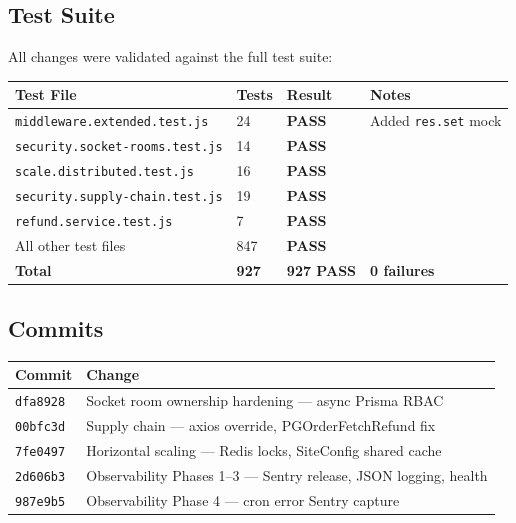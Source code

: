 \documentclass[12pt,a4paper]{article}
\newcommand{\cellok}[1]{\cellcolor{ok!15}\textbf{\color{ok}#1}}
\begin{document}
\subsection{Test Suite}

All changes were validated against the full test suite:

\begin{center}
\begin{tabular}{llll}
\toprule
\textbf{Test File} & \textbf{Tests} & \textbf{Result} & \textbf{Notes} \\
\midrule
\texttt{middleware.extended.test.js} & 24 & \cellok{PASS} & Added \texttt{res.set} mock \\
\texttt{security.socket-rooms.test.js} & 14 & \cellok{PASS} & \\
\texttt{scale.distributed.test.js} & 16 & \cellok{PASS} & \\
\texttt{security.supply-chain.test.js} & 19 & \cellok{PASS} & \\
\texttt{refund.service.test.js} & 7 & \cellok{PASS} & \\
All other test files & 847 & \cellok{PASS} & \\
\midrule
\textbf{Total} & \textbf{927} & \cellok{\textbf{927 PASS}} & \textbf{0 failures} \\
\bottomrule
\end{tabular}
\end{center}

\subsection{Commits}

\begin{center}
\begin{tabular}{ll}
\toprule
\textbf{Commit} & \textbf{Change} \\
\midrule
\texttt{dfa8928} & Socket room ownership hardening — async Prisma RBAC \\
\texttt{00bfc3d} & Supply chain — axios override, PGOrderFetchRefund fix \\
\texttt{7fe0497} & Horizontal scaling — Redis locks, SiteConfig shared cache \\
\texttt{2d606b3} & Observability Phases 1–3 — Sentry release, JSON logging, health \\
\texttt{987e9b5} & Observability Phase 4 — cron error Sentry capture \\
\bottomrule
\end{tabular}
\end{center}
\end{document}
